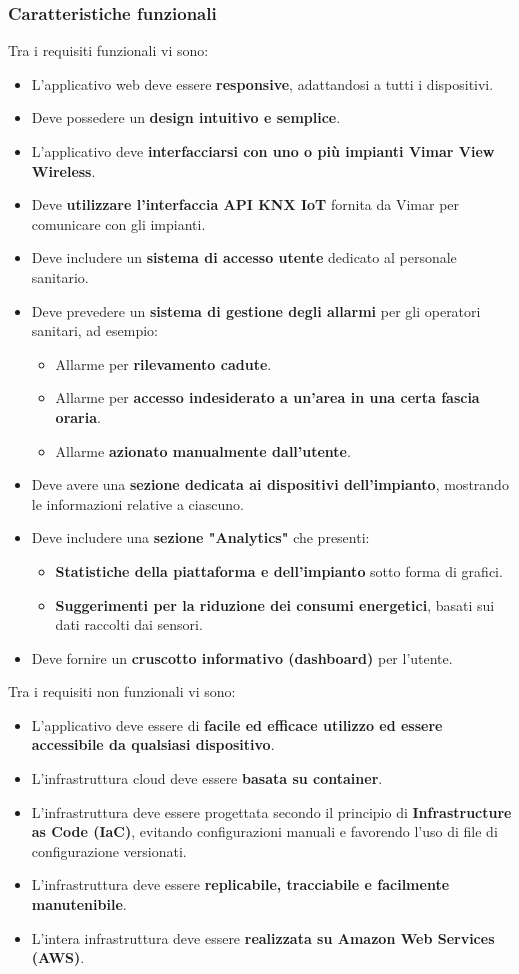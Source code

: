 \documentclass[a4paper,11pt]{article}
\begin{document}
\subsubsection{Caratteristiche funzionali}
Tra i requisiti funzionali vi sono:
\begin{itemize}
  \item L'applicativo web deve essere \textbf{responsive}, adattandosi a tutti i dispositivi.
  \item Deve possedere un \textbf{design intuitivo e semplice}.
  \item L'applicativo deve \textbf{interfacciarsi con uno o più impianti Vimar View Wireless}.
  \item Deve \textbf{utilizzare l'interfaccia API KNX IoT} fornita da Vimar per comunicare con gli impianti.
  \item Deve includere un \textbf{sistema di accesso utente} dedicato al personale sanitario.
  \item Deve prevedere un \textbf{sistema di gestione degli allarmi} per gli operatori sanitari, ad esempio:
  \begin{itemize}
    \item Allarme per \textbf{rilevamento cadute}.
    \item Allarme per \textbf{accesso indesiderato a un'area in una certa fascia oraria}.
    \item Allarme \textbf{azionato manualmente dall'utente}.
  \end{itemize}
  \item Deve avere una \textbf{sezione dedicata ai dispositivi dell'impianto}, mostrando le informazioni relative a ciascuno.
  \item Deve includere una \textbf{sezione "Analytics"} che presenti:
  \begin{itemize}
    \item \textbf{Statistiche della piattaforma e dell'impianto} sotto forma di grafici.
    \item \textbf{Suggerimenti per la riduzione dei consumi energetici}, basati sui dati raccolti dai sensori.
  \end{itemize}
  \item Deve fornire un \textbf{cruscotto informativo (dashboard)} per l'utente.
\end{itemize}

Tra i requisiti non funzionali vi sono:
\begin{itemize}
  \item L'applicativo deve essere di \textbf{facile ed efficace utilizzo ed essere accessibile da qualsiasi dispositivo}.
  \item L'infrastruttura cloud deve essere \textbf{basata su container}.
  \item L'infrastruttura deve essere progettata secondo il principio di \textbf{Infrastructure as Code (IaC)}, evitando configurazioni manuali e favorendo l'uso di file di configurazione versionati.
  \item L'infrastruttura deve essere \textbf{replicabile, tracciabile e facilmente manutenibile}.
  \item L'intera infrastruttura deve essere \textbf{realizzata su Amazon Web Services (AWS)}.
\end{itemize}
\end{document}
